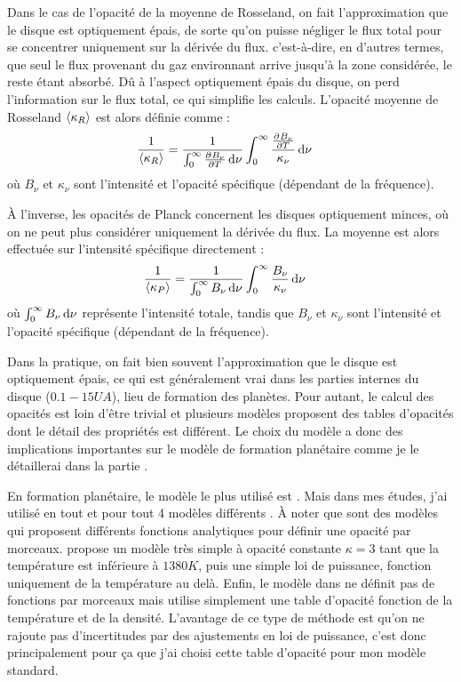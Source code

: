 Dans le cas de l'opacité de la moyenne de Rosseland, on fait l'approximation que le disque est optiquement épais, de sorte qu'on puisse négliger le flux total pour se concentrer uniquement sur la dérivée du flux. c'est-à-dire, en d'autres termes, que seul le flux provenant du gaz environnant arrive jusqu'à la zone considérée, le reste étant absorbé. Dû à l'aspect optiquement épais du disque, on perd l'information sur le flux total, ce qui simplifie les calculs. L'opacité moyenne de Rosseland $\left\langle \kappa_R\right\rangle$ est alors définie comme : 
\begin{align}
\inv{\moy{\kappa_R}} &= \inv{\int_0^\infty \pd{B_\nu}{T}\dif \nu} \int_0^\infty \frac{\pd{B_\nu}{T}}{\kappa_\nu}\dif \nu
\end{align}
où $B_\nu$ et $\kappa_\nu$ sont l'intensité et l'opacité spécifique (dépendant de la fréquence).

À l'inverse, les opacités de Planck concernent les disques optiquement minces, où on ne peut plus considérer uniquement la dérivée du flux. La moyenne est alors effectuée sur l'intensité spécifique directement : 
\begin{align}
\frac{1}{\left\langle \kappa_P\right\rangle} &= \frac{1}{\int_0^\infty B_\nu\operatorname{d \!} \nu} \int_0^\infty \frac{B_\nu}{\kappa_\nu}\operatorname{d \!} \nu
\end{align}
où $\int_0^\infty B_\nu\operatorname{d \!} \nu$ représente l'intensité totale, tandis que $B_\nu$ et $\kappa_\nu$ sont l'intensité et l'opacité spécifique (dépendant de la fréquence).

Dans la pratique, on fait bien souvent l'approximation que le disque est optiquement épais, ce qui est généralement vrai dans les parties internes du disque ($0.1-15\unit{UA}$), lieu de formation des planètes. Pour autant, le calcul des opacités est loin d'être trivial et plusieurs modèles proposent des tables d'opacités dont le détail des propriétés est différent. Le choix du modèle a donc des implications importantes sur le modèle de formation planétaire comme je le détaillerai dans la partie . 

En formation planétaire, le modèle le plus utilisé est \citep{bell1994FU}. Mais dans mes études, j'ai utilisé en tout et pour tout 4 modèles différents \citep{bell1994FU, zhu2009nonsteady, chambers2009analytic, hure2000transition}. À noter que \citep{bell1994FU, zhu2009nonsteady} sont des modèles qui proposent différents fonctions analytiques pour définir une opacité par morceaux. \citep{chambers2009analytic} propose un modèle très simple à opacité constante $\kappa=3$ tant que la température est inférieure à $1380\unit{K}$, puis une simple loi de puissance, fonction uniquement de la température au delà. Enfin, le modèle dans \citep{hure2000transition} ne définit pas de fonctions par morceaux mais utilise simplement une table d'opacité fonction de la température et de la densité. L'avantage de ce type de méthode est qu'on ne rajoute pas d'incertitudes par des ajustements en loi de puissance, c'est donc principalement pour ça que j'ai choisi cette table d'opacité pour mon modèle standard. 

